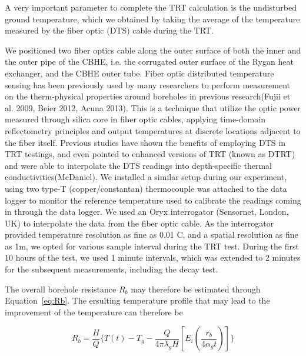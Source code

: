	A very important parameter to complete the TRT calculation is the undisturbed ground temperature, which we obtained by taking the average of the temperature measured by the fiber optic (DTS) cable during the TRT. 
	
	We positioned two fiber optics cable along the outer surface of both the inner and the outer pipe of the CBHE, i.e. the corrugated outer surface of the Rygan heat exchanger, and the CBHE outer tube. Fiber optic distributed temperature sensing has been previously used by many researchers to perform measurement on the therm-physical properties around boreholes in previous research(Fujii et al. 2009, Beier 2012, Acuna 2013). This is a technique that utilize the optic power measured through silica core in fiber optic cables, applying time-domain reflectometry principles and output temperatures at discrete locations adjacent to the fiber itself. Previous studies have shown the benefits of employing DTS in TRT testings, and even pointed to enhanced versions of TRT (known as DTRT) and were able to interpolate the DTS readings into depth-specific thermal conductivities(McDaniel). We installed a similar setup during our experiment, using two type-T (copper/constantan) thermocouple was attached to the data logger to monitor the reference temperature used to calibrate the readings coming in through the data logger. We used an Oryx interrogator (Sensornet, London, UK) to interpolate the data from the fiber optic cable. As the interrogator provided temperature resolution as fine as 0.01 C, and a spatial resolution as fine as 1m, we opted for various sample interval during the TRT test. During the first 10 hours of the test, we used 1 minute intervals, which was extended to 2 minutes for the subsequent measurements, including the decay test. 

	
	The overall borehole resistance $R_b$ may therefore be estimated through Equation~\ref{eq:Rb}\cite{beier_situ_2012}. The ersulting temperature profile that may lead to the improvement of the temperature can therefore be 
	
	\begin{equation}
		R_b = \frac{H}{Q}\{ T(t) - T_g -\frac{Q}{4\pi \lambda_g H} [E_i(\frac{r_b}{4 \alpha_g t})]   \}\label{eq:Rb}
	\end{equation}
	
